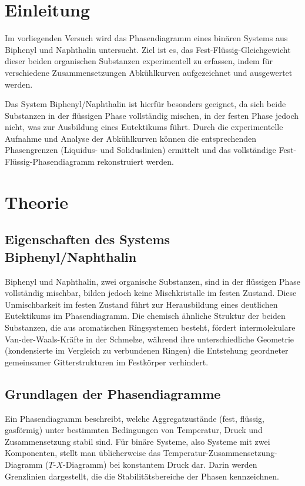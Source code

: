 \section{Einleitung}

 Im vorliegenden Versuch wird das Phasendiagramm eines binären Systems aus Biphenyl und Naphthalin untersucht.
 Ziel ist es, das Fest-Flüssig-Gleichgewicht dieser beiden organischen Substanzen experimentell zu erfassen, indem für verschiedene Zusammensetzungen Abkühlkurven aufgezeichnet und ausgewertet werden.
 
 Das System Biphenyl/Naphthalin ist hierfür besonders geeignet, da sich beide Substanzen in der flüssigen Phase vollständig mischen, in der festen Phase jedoch nicht, was zur Ausbildung eines Eutektikums führt.
 Durch die experimentelle Aufnahme und Analyse der Abkühlkurven können die entsprechenden Phasengrenzen (Liquidus- und Soliduslinien) ermittelt und das vollständige Fest-Flüssig-Phasendiagramm rekonstruiert werden. 

\section{Theorie}

\subsection{Eigenschaften des Systems Biphenyl/Naphthalin}

Biphenyl und Naphthalin, zwei organische Substanzen, sind in der flüssigen Phase vollständig mischbar, bilden jedoch keine Mischkristalle im festen Zustand.\autocite{t3_skript}
Diese Unmischbarkeit im festen Zustand führt zur Herausbildung eines deutlichen Eutektikums im Phasendiagramm.
Die chemisch ähnliche Struktur der beiden Substanzen, die aus aromatischen Ringsystemen besteht, fördert intermolekulare Van-der-Waals-Kräfte in der Schmelze, während ihre unterschiedliche Geometrie (kondensierte im Vergleich zu verbundenen Ringen) die Entstehung geordneter gemeinsamer Gitterstrukturen im Festkörper verhindert.

\subsection{Grundlagen der Phasendiagramme}

Ein Phasendiagramm beschreibt, welche Aggregatzustände (fest, flüssig, gasförmig) unter bestimmten Bedingungen von Temperatur, Druck und Zusammensetzung stabil sind.
Für binäre Systeme, also Systeme mit zwei Komponenten, stellt man üblicherweise das Temperatur-Zusammensetzung-Diagramm ($T$-$X$-Diagramm) bei konstantem Druck dar.\autocite{callister2020callister}
Darin werden Grenzlinien dargestellt, die die Stabilitätsbereiche der Phasen kennzeichnen.

